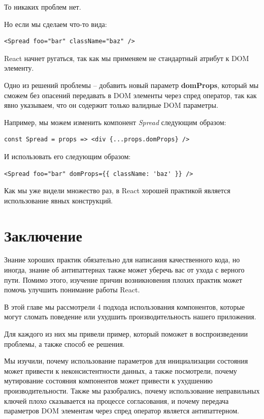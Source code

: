 То никаких проблем нет.

Но если мы сделаем что-то вида:

\begin{lstlisting}
<Spread foo="bar" className="baz" />
\end{lstlisting}

React начнет ругаться, так как мы применяем не стандартный атрибут к DOM элементу.

Одно из решений проблемы -- добавить новый параметр \textbf{domProps}, который мы сможем без опасений передавать в DOM элементы через спред оператор, так как явно указываем, что он содержит только валидные DOM параметры.

Например, мы можем изменить компонент \textit{Spread} следующим образом:

\begin{lstlisting}
const Spread = props => <div {...props.domProps} />
\end{lstlisting}

И использовать его следующим образом:

\begin{lstlisting}
<Spread foo="bar" domProps={{ className: 'baz' }} />
\end{lstlisting}

Как мы уже видели множество раз, в React хорошей практикой является использование явных конструкций.

\section{Заключение}

Знание хороших практик обязательно для написания качественного кода, но иногда, знание об антипаттернах также может уберечь вас от ухода с верного пути. Помимо этого, изучение причин возникновения плохих практик может помочь улучшить понимание работы React.

В этой главе мы рассмотрели 4 подхода использования компонентов, которые могут сломать поведение или ухудшить производительность нашего приложения.

Для каждого из них мы привели пример, который поможет в воспроизведении проблемы, а также способ ее решения.

Мы изучили, почему использование параметров для инициализации состояния может привести к неконсистентности данных, а также посмотрели, почему мутирование состояния компонентов может привести к ухудшению производительности. Также мы разобрались, почему использование неправильных ключей плохо сказывается на процессе согласования, и почему передача параметров DOM элементам через спред оператор является антипаттерном.









